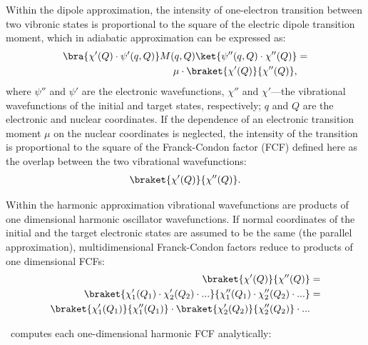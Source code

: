 \documentclass[11pt]{article}
\begin{document}
Within the dipole approximation, the intensity of one-electron transition between two vibronic states
is proportional to the square of the electric dipole transition moment, which
in adiabatic approximation can be expressed as:
\begin{align}
\bra{\chi '(Q)\cdot\psi'(q,Q)} M(q,Q) \ket{\psi''(q,Q)\cdot\chi''(Q)} & = \nonumber\\
\mu \cdot \braket{\chi '(Q)}{\chi ''(Q)}, & 
\end{align}
where
$\psi''$ and $\psi'$ are the electronic wavefunctions, $\chi''$ and $\chi'$---the vibrational wavefunctions
of the initial and target states, respectively;
$q$ and $Q$ are the electronic and nuclear coordinates.
If the dependence 
of an electronic transition moment $\mu$  on the nuclear coordinates is neglected,
the intensity of the transition is proportional to the square of the 
Franck-Condon factor (FCF)\cite{Franck:25,Condon:26,Gozem:2021:ezSpectra}
defined here as the overlap between the two vibrational wavefunctions:
\begin{align}
\braket{\chi '(Q)}{\chi ''(Q)}.
\end{align}

Within the harmonic approximation vibrational wavefunctions are products of
one dimensional harmonic oscillator wavefunctions. 
If normal coordinates of the initial and the target electronic states are assumed to be the same
(the parallel approximation),
multidimensional Franck-Condon factors reduce to products of one dimensional FCFs:
\begin{align}
\braket{\chi'(Q)}{\chi''(Q)}&=\nonumber\\
\braket{\chi'_1(Q_1)\cdot\chi'_2(Q_2)\cdot...}{\chi''_1(Q_1)\cdot\chi''_2(Q_2)\cdot...}&=\nonumber\\
\braket{\chi'_1(Q_1)}{\chi''_1(Q_1)}\cdot\braket{\chi'_2(Q_2)}{\chi''_2(Q_2)}\cdot...&
\label{eq:product_fcf}
\end{align}

\ezFCF\ computes each one-dimensional harmonic FCF analytically\cite{FranckCondon:Math:30}:
\end{document}
